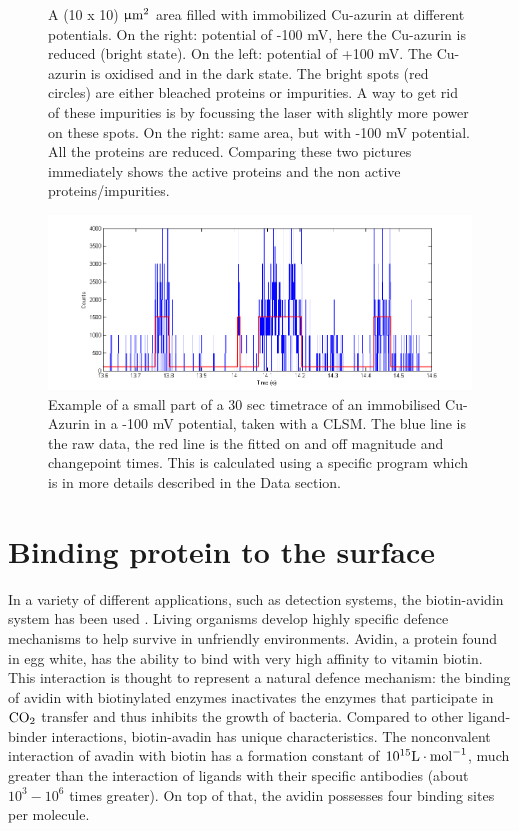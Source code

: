 \documentclass[twoside,single]{lion-msc}
\begin{document}
\begin{figure}
\begin{subfigure}{.5\textwidth}
  \label{}
\end{subfigure}
\caption{A  (10 x 10) $\upmu \textup{m}^{2}$  area filled with immobilized Cu-azurin at different potentials. On the right: potential of -100 mV, here the Cu-azurin is reduced (bright state). On the left: potential of +100 mV. The Cu-azurin is oxidised and in the dark state. The bright spots (red circles) are either bleached proteins or impurities. A way to get rid of these impurities is by focussing the laser with slightly more power on these spots. On the right: same area, but with -100 mV potential. All the proteins are reduced. Comparing these two pictures immediately shows the active proteins and the non active proteins/impurities.}
\label{finding_proteins_1}
\end{figure}


\begin{figure}[ht!]
\centering
\includegraphics[width= \textwidth]{TT_example}
\caption{Example of a small part of a 30 sec timetrace of an immobilised Cu-Azurin in a -100 mV potential, taken with a CLSM. The blue line is the raw data, the red line is the fitted on and off magnitude and changepoint times. This is calculated using a specific program which is in more details described in the Data section.} 
\label{TT_exam}
\end{figure}

\section{Binding protein to the surface}\label{neutra}
In a variety of different applications, such as detection systems, the biotin-avidin system has been used \cite{Diamandis1991}. Living organisms develop highly specific defence mechanisms to help survive in unfriendly environments. Avidin, a protein found in egg white, has the ability to bind with very high affinity to vitamin biotin. This interaction is thought to represent a natural defence mechanism: the binding of avidin with biotinylated enzymes inactivates the enzymes that participate in $\textup{CO}_{2}$ transfer and thus inhibits the growth of bacteria. Compared to other  ligand-binder interactions, biotin-avadin has unique characteristics. The nonconvalent interaction of avadin with biotin has a formation constant of $10^{15}\textup{L}\cdot \textup{mol}^{-1}$, much greater than the interaction of ligands with their specific antibodies (about $10^{3}-10^{6}$ times greater). On top of that, the avidin possesses four binding sites per molecule. 
\end{document}

